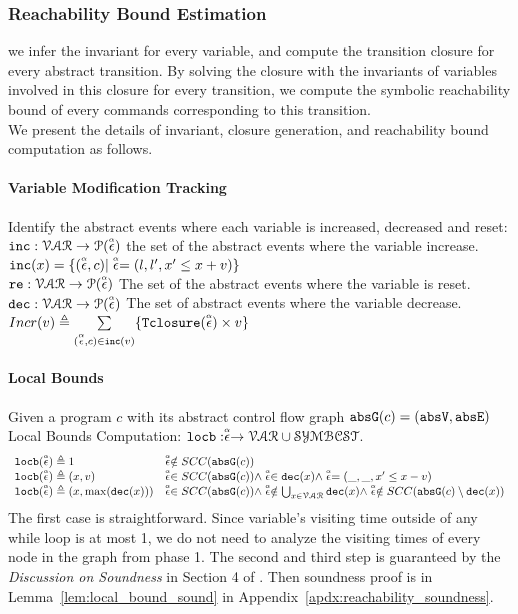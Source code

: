 \subsubsection{Reachability Bound Estimation}
%
we infer the invariant for every variable, and compute the transition closure for every abstract transition. By solving the closure
with the invariants of variables involved in this closure for every transition, we compute
the symbolic reachability bound of every commands corresponding to this transition.
\\
We present the details of invariant, closure generation, and reachability bound computation as follows.
%
\paragraph*{Variable Modification Tracking}
Identify the abstract events where each variable is increased, decreased and reset:
\\
$\inc: \mathcal{VAR} \to \mathcal{P}(\absevent) $
the set of the abstract events where the variable increase.
\\
$\inc(x) = \{(\absevent, c) | \absevent = (l, l', x' \leq x + v)\}$
\\
$\reset: \mathcal{VAR} \to \mathcal{P}(\absevent) $
The set of the abstract events where the variable is reset.
\\
$\dec: \mathcal{VAR} \to \mathcal{P}(\absevent) $
The set of abstract events where the variable decrease.
\\
$Incr(v) \triangleq \sum\limits_{(\absevent, c) \in \inc(v)}\{\absclr(\absevent) \times v\}$
%
\paragraph*{Local Bounds}
Given a program $c$ with its abstract control flow graph 
$\absG(c) = (\absV, \absE)$
\\
Local Bounds Computation:
$\locbound: \absevent \to \mathcal{VAR} \cup \constdom$.
%
\[ 
\begin{array}{ll}
  \locbound(\absevent) \triangleq 1 
  & \absevent \notin SCC(\absG(c))
  \\
  \locbound(\absevent) \triangleq (x, v) 
  & \absevent \in SCC(\absG(c)) \land \absevent \in \dec(x) \land  \absevent = (\_, \_ , x' \leq x - v) \\
  \locbound(\absevent) \triangleq (x, \max(\dec(x))) 
  & \absevent \in SCC(\absG(c)) \land 
  \absevent  \notin \bigcup_{x \in \mathcal{VAR}} \dec(x)
  \land \absevent \notin SCC(\absG(c) \setminus \dec(x)) 
\end{array}
  \]
  The first case is straightforward. Since variable's visiting time outside of any while loop is at most 1, we do not need to analyze the visiting times of every node in the graph from phase 1.
  The second and third step is guaranteed by the \emph{Discussion on Soundness} in Section 4 of \cite{sinn2017complexity}.
  Then soundness proof is in Lemma~\ref{lem:local_bound_sound} in Appendix~\ref{apdx:reachability_soundness}.
%
